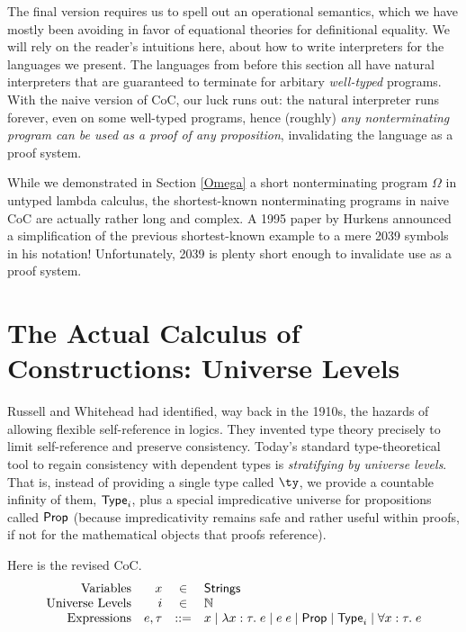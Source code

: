 \documentclass{amsbook}
\theoremstyle{definition}
\theoremstyle{remark}
\numberwithin{section}{chapter}
\numberwithin{equation}{chapter}
\begin{document}
The final version requires us to spell out an operational semantics, which we have mostly been avoiding in favor of equational theories for definitional equality.
We will rely on the reader's intuitions here, about how to write interpreters for the languages we present.
The languages from before this section all have natural interpreters that are guaranteed to terminate for arbitary \emph{well-typed} programs.
With the naive version of CoC, our luck runs out: the natural interpreter runs forever, even on some well-typed programs, hence (roughly) \emph{any nonterminating program can be used as a proof of any proposition}, invalidating the language as a proof system.

While we demonstrated in Section \ref{Omega} a short nonterminating program $\Omega$ in untyped lambda calculus, the shortest-known nonterminating programs in naive CoC are actually rather long and complex.
A 1995 paper by Hurkens announced a simplification of the previous shortest-known example to a mere 2039 symbols in his notation!
Unfortunately, 2039 is plenty short enough to invalidate use as a proof system.

\section{The Actual Calculus of Constructions: Universe Levels}

\newcommand{\tyn}[1]{\lc{Type}_{#1}}
\newcommand{\prop}[0]{\lc{Prop}}

Russell and Whitehead had identified, way back in the 1910s, the hazards of allowing flexible self-reference in logics.
They invented type theory precisely to limit self-reference and preserve consistency.
Today's standard type-theoretical tool to regain consistency with dependent types is \emph{stratifying by universe levels}.
That is, instead of providing a single type called $\ty$, we provide a countable infinity of them, $\tyn{i}$, plus a special impredicative universe for propositions called $\prop$ (because impredicativity remains safe and rather useful within proofs, if not for the mathematical objects that proofs reference).

Here is the revised CoC.
$$\begin{array}{rrcl}
  \textrm{Variables} & x &\in& \mathsf{Strings} \\
  \textrm{Universe Levels} & i &\in& \mathbb{N} \\
  \textrm{Expressions} & e, \tau &::=& x \mid \lambda x : \tau. \; e \mid e \; e \mid \prop \mid \tyn{i} \mid \forall x : \tau. \; e
\end{array}$$
\end{document}

